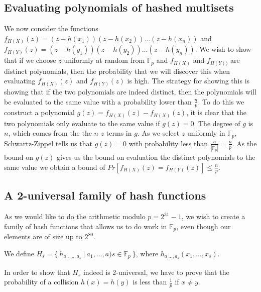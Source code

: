 \documentclass[article,a4paper,oneside]{article}
\newcommand{\+}[1]{\ensuremath{\boldsymbol{#1}}}
\begin{document}
\subsection*{Evaluating polynomials of hashed multisets}
We now consider the functions $f_{H(X)}(z) = (z-h(x_1))(z-h(x_2))\ldots(z - h(x_n))$ and $f_{H(Y)}(z) = (z-h(y_1))(z-h(y_2))\ldots(z - h(y_n))$.
We wish to show that if we choose $z$ uniformly at random from $\mathbb{F}_p$ and $f_{H(X)}$ and $f_{H(Y))}$ are distinct polynomials, then the probability that we will discover this when evaluating $f_{H(X)}(z)$ and $f_{H(Y)}(z)$ is high. The strategy for showing this is showing that if the two polynomials are indeed distinct, then the polynomials will be evaluated to the same value with a probability lower than $\frac{n}{p}$.
To do this we construct a polynomial $g(z) = f_{H(X)}(z) - f_{H(X)}(z)$, it is clear that the two polynomials only evaluate to the same value if $g(z) = 0$. The degree of $g$ is $n$, which comes from the the $n$ $z$ terms in $g$.
As we select $z$ uniformly in $\mathbb{F}_p$, Schwartz-Zippel tells us that $g(z) = 0$ with probability less than $\frac{n}{|\mathbb{F}_p|} = \frac{n}{p}$. As the bound on $g(z)$ gives us the bound on evaluation the distinct polynomials to the same value we obtain a bound of $Pr[f_{H(X)}(z) = f_{H(Y)}(z)] \leq \frac{n}{p}$.

\subsection*{A 2-universal family of hash functions}
As we would like to do the arithmetic modulo $p = 2^{31}-1$, we wish to create a family of hash functions that allows us to do work in $\mathbb{F}_p$, even though our elements are of size up to $2^{80}$.

We define $H_s=\{\ h_{a_1,\ldots,a_s}\ | \ a_1,\ldots,a)s\in \mathbb{F}_p\ \}$,
where $h_{a_,\ldots,a_s}(x_1,\ldots,x_s)$.

In order to show that $H_s$ indeed is 2-universal, we have to prove that the probability of a collision $h(x) = h(y)$ is less than $\frac{1}{p}$ if $x \neq y$.
\end{document}
